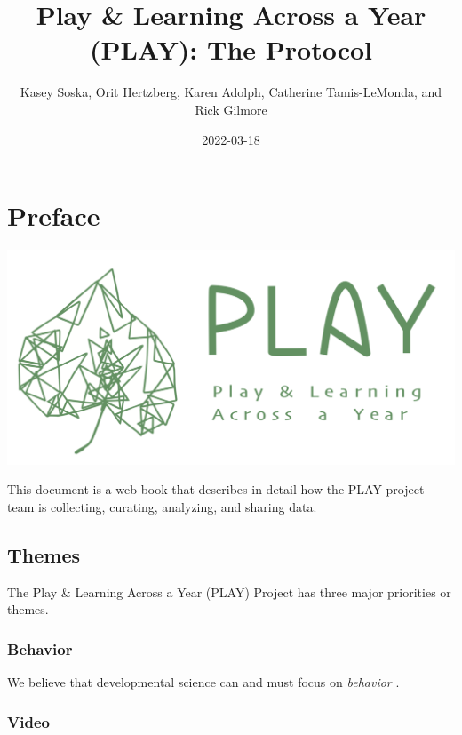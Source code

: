 \documentclass[
  12pt,
]{book}
\title{Play \& Learning Across a Year (PLAY): The Protocol}
\author{Kasey Soska, Orit Hertzberg, Karen Adolph, Catherine Tamis-LeMonda, and Rick Gilmore}
\date{2022-03-18}
\begin{document}
\maketitle

{
\setcounter{tocdepth}{1}
\tableofcontents
}
\hypertarget{preface}{%
\chapter*{Preface}\label{preface}}

\begin{center}\href{https://play-project.org}{\includegraphics[width=0.7\linewidth]{img/PLAY-logo} }\end{center}

This document is a web-book that describes in detail how the PLAY project team is collecting, curating, analyzing, and sharing data.

\hypertarget{themes}{%
\section*{Themes}\label{themes}}

The Play \& Learning Across a Year (PLAY) Project has three major priorities or themes.

\hypertarget{behavior}{%
\subsection*{Behavior}\label{behavior}}

We believe that developmental science can and must focus on \emph{behavior} \citep{Adolph2020-rj}.

\hypertarget{video}{%
\subsection*{Video}\label{video}}
\end{document}

